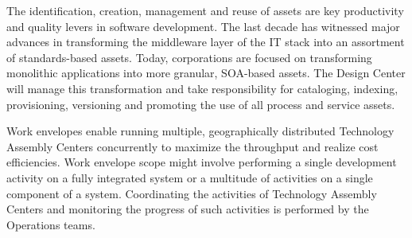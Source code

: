 The identification, creation, management and reuse of assets are key productivity and quality levers in software development. The last decade has witnessed major advances in transforming the middleware layer of the IT stack into an assortment of standards-based assets. Today, corporations are focused on transforming monolithic applications into more granular, SOA-based assets. The Design Center will manage this transformation and take responsibility for cataloging, indexing, provisioning, versioning and promoting the use of all process and service assets.

Work envelopes enable running multiple, geographically distributed Technology Assembly Centers concurrently to maximize the throughput and realize cost efficiencies. Work envelope scope might involve performing a single development activity on a fully integrated system or a multitude of activities on a single component of a system. Coordinating the activities of Technology Assembly Centers and monitoring the progress of such activities is performed by the Operations teams.



\label{sec:global}



